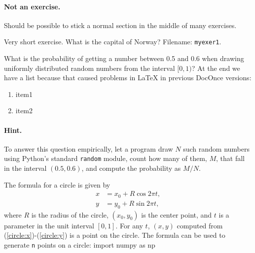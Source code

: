 \documentclass[%
oneside,                 %
final,                   %
10pt]{article}
\newenvironment{doconceexercise}{}{}
\newcounter{doconceexercisecounter}
\theoremstyle{definition}
\begin{document}
\begin{enumerate}
\paragraph{Not an exercise.}
Should be possible to stick a normal section in the middle of many
exercises.
\begin{doconceexercise}
                             
\label{my:exer1}
Very short exercise. What is the capital
of Norway?
\noindent Filename: \texttt{myexer1}.
\end{doconceexercise}
\begin{doconceexercise}
                             
\label{demo:ex:2}
What is the probability of getting a number between 0.5 and 0.6 when
drawing uniformly distributed random numbers from the interval $[0,1)$?
At the end we have a list because that caused problems in {\LaTeX}
in previous DocOnce versions:
\begin{enumerate}
\item item1
\item item2
\end{enumerate}
\noindent
\paragraph{Hint.}
To answer this question empirically, let a program
draw $N$ such random numbers using Python's standard \texttt{random} module,
count how many of them, $M$, that fall in the interval $(0.5,0.6)$, and
compute the probability as $M/N$.
\end{doconceexercise}
\begin{doconceexercise}
                             
\label{proj:circle1}
The formula for a circle is given by
\begin{align}
x &= x_0 + R\cos 2\pi t,
\label{circle:x}\\ 
y &= y_0 + R\sin 2\pi t,
\label{circle:y}
\end{align}
where $R$ is the radius of the circle, $(x_0,y_0)$ is the
center point, and $t$ is a parameter in the unit interval $[0,1]$.
For any $t$, $(x,y)$ computed from (\ref{circle:x})-(\ref{circle:y})
is a point on the circle.
The formula can be used to generate \texttt{n} points on a circle:
\bpypro
import numpy as np


\end{doconceexercise}
\end{enumerate}
\end{document}
